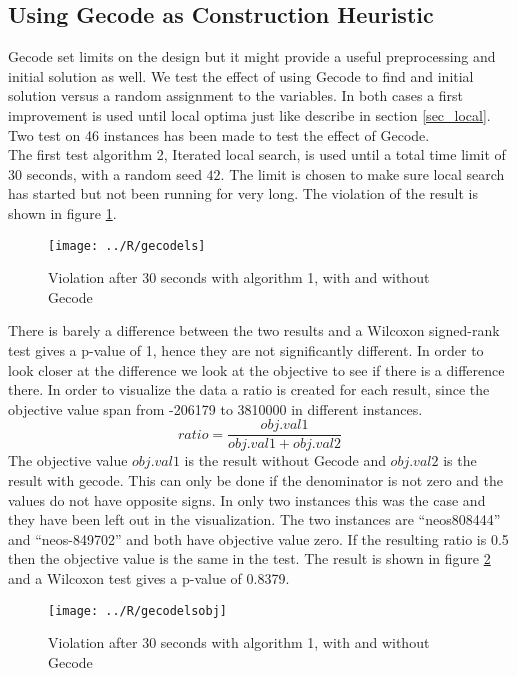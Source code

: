 \subsection{Using Gecode as Construction Heuristic}
Gecode set limits on the design but it might provide a useful preprocessing and initial solution as well. We test 
the effect of using Gecode to find and initial solution versus a random assignment to the variables. In both cases a 
first improvement is used until local optima just like describe in section \ref{sec_local}. Two test on 46 instances 
has been made to test the effect of Gecode. \\ 
The first test algorithm 2, Iterated local search, is used until a total time limit of 30 seconds, with a random seed 
$42$. The limit is chosen to make sure local search has started but not been running for very long. The violation of 
the result is shown in figure \ref{fig_gecodels}. 
\begin{figure}[!h]
\centering
\texttt{[image: ../R/gecodels]} \caption{Violation after 30 seconds with 
algorithm 1, with and without Gecode}\label{fig_gecodels}
\end{figure}\noindent
There is barely a difference between the two results and a Wilcoxon signed-rank test gives a p-value of 1, hence they 
are not significantly different. In order to look closer at the difference we look at the objective to see if there is 
a difference there. In order to visualize the data a ratio is created for each result, since the objective value span
from -206179 to 3810000 in different instances. 
\begin{equation}
 ratio = \frac{obj.val1}{obj.val1+obj.val2}
\end{equation}
The objective value $obj.val1$ is the result without Gecode and $obj.val2$ is the result with gecode. This can only 
be done if the denominator is not zero and the values do not have opposite signs. In only two instances this was the 
case and they have been left out in the visualization. The two instances are ``neos808444'' and ``neos-849702'' and 
both have objective value zero. If the resulting ratio is 0.5 then the objective value is the same in the test. The 
result is shown in figure \ref{fig_gecodelsobj} and a Wilcoxon test gives a p-value of 0.8379. 
\begin{figure}[!h]
\centering
\texttt{[image: ../R/gecodelsobj]} \caption{Violation after 30 seconds with 
algorithm 1, with and without Gecode}\label{fig_gecodelsobj}
\end{figure}\noindent
